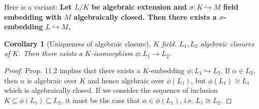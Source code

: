 \documentclass{article}
\theoremstyle{definition}
\theoremstyle{remark}
\theoremstyle{plain}
\newtheorem{crly}[defn]{Corollary}
\begin{document}
Here is a variant:
\textbf{Let $L/K$ be algebraic extension and $\sigma:K\hookrightarrow M$ field embedding with $M$ algebraically closed. Then there exists a $\sigma$-embedding $L\hookrightarrow M$.}
\begin{crly}[Uniqueness of algebraic closure]
    $K$ field. $L_1,L_2$ algebraic closures of $K$. Then there exists a $K$-isomorphism $\phi:L_1\to L_2$.
\end{crly}
\begin{proof}
    Prop. 11.2 implies that there exists a $K$-embedding $\phi:L_1\hookrightarrow L_2$. If $\alpha\in L_2$, then $\alpha$ is algebraic over $K$ and hence algebraic over $\phi(L_1)$, but $\phi(L_1)\cong L_1$ which is algebraically closed. If we consider the sequence of inclusion $K\subseteq \phi(L_1)\subseteq L_2$, it must be the case that $\alpha\in \phi(L_1)$, i.e. $L_1\cong L_2$.
\end{proof}
\end{document}
